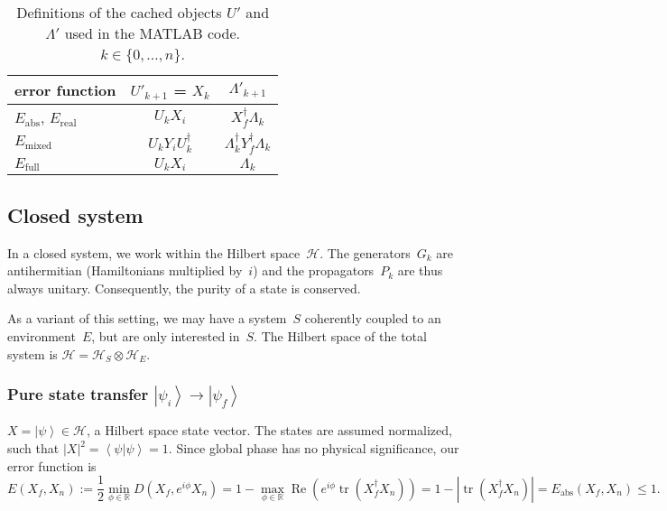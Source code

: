 \documentclass[aps, pra, a4paper, longbibliography]{revtex4}
\newcommand{\be}{\begin{equation}}
\newcommand{\ee}{\end{equation}}
\newcommand{\R}{{\mathbb R}}  %
\newcommand{\ket}[1]{\left| #1 \right \rangle}
\newcommand{\bra}[1]{\left \langle #1 \right|}
\newcommand{\braket}[2]{\left \langle #1 | #2 \right \rangle}
\newcommand{\ketbra}[2]{\left| #1 \right \rangle \left \langle #2 \right|}
\newcommand{\hilb}[1]{\mathcal{#1}}
\DeclareMathOperator{\tr}{tr}
\DeclareMathOperator{\re}{Re}
\DeclareMathOperator{\cvec}{vec}
\begin{document}
\begin{table}
\begin{tabular}{l|c|c}
error function & $U'_{k+1}$ = $X_k$ & $\Lambda'_{k+1}$\\
\hline
$E_\text{abs}$, $E_\text{real}$ & $U_k X_i$ & $X_f^\dagger \Lambda_k$\\
$E_\text{mixed}$ & $U_k Y_i U_k^\dagger$ & $\Lambda_k^\dagger Y_f^\dagger \Lambda_k$\\
$E_\text{full}$ & $U_k X_i$ & $\Lambda_k$
\end{tabular}
\caption{Definitions of the cached objects $U'$ and $\Lambda'$ used in the MATLAB
  code. $k \in \{0, \ldots, n\}$.}
\label{table:UL}
\end{table}


\subsection{Closed system}

In a closed system, we work within the Hilbert space~$\hilb{H}$.
The generators~$G_k$ are antihermitian (Hamiltonians multiplied by~$i$)
and the propagators~$P_k$ are thus always
unitary. Consequently, the purity of a state is conserved.

As a variant of this setting,
we may have a system~$S$ coherently coupled to an
environment~$E$, but are only interested in~$S$.
The Hilbert space of the total system is
$\hilb{H} = \hilb{H}_S \otimes \hilb{H}_E$.


\subsubsection{Pure state transfer $\ket{\psi_i} \to \ket{\psi_f}$}
\label{sec:closed-pure}

$X = \ket{\psi} \in \hilb{H}$, a Hilbert space state vector.
The states are assumed normalized, such that $|X|^2 = \braket{\psi}{\psi} = 1$.
Since global phase has no physical significance, our error function is
\be
E(X_f, X_n) := \frac{1}{2} \min_{\phi \in \R} D(X_f, e^{i \phi} X_n)
= 1 -\max_{\phi \in \R} \re \left( e^{i \phi} \tr(X_f^\dagger X_n)\right)
= 1 -|\tr(X_f^\dagger X_n)|
= E_\text{abs}(X_f, X_n) \le 1.
\ee

\begin{comment}
This result can also be obtained using the mixed state formula in the
vec representation, with $\rho = \ketbra{\psi}{\psi}$ and thus
$X = \cvec(\rho) = \ket{\psi^*} \otimes \ket{\psi}$.
The fidelity diagram breaks into two pieces and
we obtain
\be
f(X_f, X_n)
= (\re) \left|(\tr) \bra{\psi_f}  P_n \cdots P_1 \ket{\psi_i} \right|^2.
\ee
with $0 \le f(X_f, X_n) \le 1$.
Thus the problem simplifies back into Hilbert space
(albeit with an extra absolute value squared in the expression for the fidelity), and we may equivalently
choose $X = \ket{\psi}$.
\end{comment}
\end{document}

